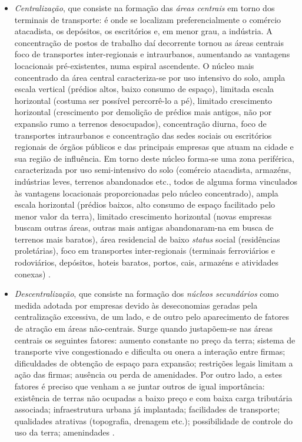 \begin{itemize}
\item \textit{Centralização}, que consiste na formação das \textit{áreas centrais} em torno dos terminais de transporte: é onde se localizam preferencialmente o comércio atacadista, os depósitos, os escritórios e, em menor grau, a indústria. A concentração de postos de trabalho daí decorrente tornou as áreas centrais foco de transportes inter-regionais e intraurbanos, aumentando as vantagens locacionais pré-existentes, numa espiral ascendente. O núcleo mais concentrado da área central caracteriza-se por uso intensivo do solo, ampla escala vertical (prédios altos, baixo consumo de espaço), limitada escala horizontal (costuma ser possível percorrê-lo a pé), limitado crescimento horizontal (crescimento por demolição de prédios mais antigos, não por expansão rumo a terrenos desocupados), concentração diurna, foco de transportes intraurbanos e concentração das sedes sociais ou escritórios regionais de órgãos públicos e das principais empresas que atuam na cidade e sua região de influência. Em torno deste núcleo forma-se uma zona periférica, caracterizada por uso semi-intensivo do solo (comércio atacadista, armazéns, indústrias leves, terrenos abandonados etc., todos de alguma forma vinculados às vantagens locacionais proporcionadas pelo núcleo concentrado), ampla escala horizontal (prédios baixos, alto consumo de espaço facilitado pelo menor valor da terra), limitado crescimento horizontal (novas empresas buscam outras áreas, outras mais antigas abandonaram-na em busca de terrenos mais baratos), área residencial de baixo \textit{status} social (residências proletárias), foco em transportes inter-regionais (terminais ferroviários e rodoviários, depósitos, hoteis baratos, portos, cais, armazéns e atividades conexas) \cite[p.~37-45]{CORREA1985espa}.
\item \textit{Descentralização}, que consiste na formação dos \textit{núcleos secundários} como medida adotada por empresas devido às deseconomias geradas pela centralização excessiva, de um lado, e de outro pelo aparecimento de fatores de atração em áreas não-centrais. Surge quando justapõem-se nas áreas centrais os seguintes fatores: aumento constante no preço da terra; sistema de transporte vive congestionado e dificulta ou onera a interação entre firmas; dificuldades de obtenção de espaço para expansão; restrições legais limitam a ação das firmas; ausência ou perda de amenidades. Por outro lado, a estes fatores é preciso que venham a se juntar outros de igual importância: existência de terras não ocupadas a baixo preço e com baixa carga tributária associada; infraestrutura urbana já implantada; facilidades de transporte; qualidades atrativas (topografia, drenagem etc.); possibilidade de controle do uso da terra; amenindades \cite[p.~45-56]{CORREA1985espa}.

\end{itemize}
